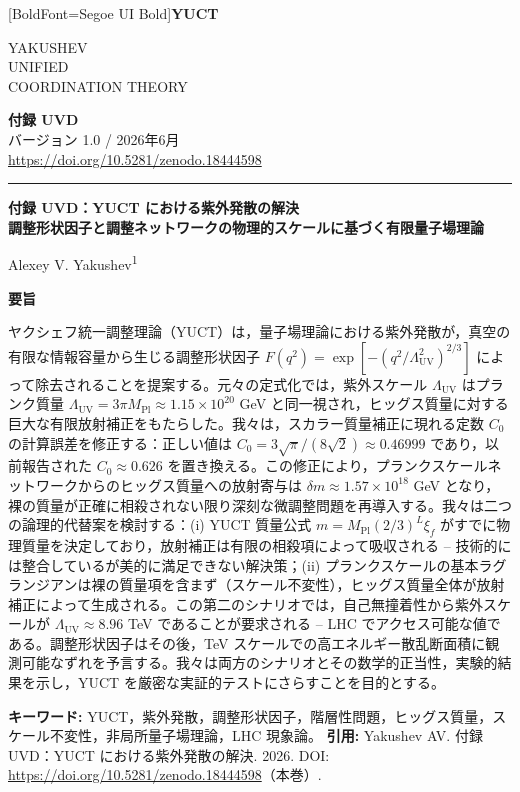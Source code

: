 \documentclass[11pt,a4paper]{article}
\newcommand{\Mpl}{M_{\mathrm{Pl}}}
\newcommand{\LUV}{\Lambda_{\mathrm{UV}}}
\theoremstyle{remark}
\newcommand{\makeheader}{%
	\noindent
	\begin{minipage}{0.17\textwidth}
		\raggedright
		{\fontspec{Segoe UI}[BoldFont=Segoe UI Bold]\bfseries\color{skyblue}\fontsize{46}{46}\selectfont YUCT}%
	\end{minipage}%
	\hspace{30pt}
	\begin{minipage}{0.32\textwidth}
		\raggedright
		{\sffamily\fontsize{11}{13}\selectfont YAKUSHEV\\ UNIFIED\\ COORDINATION THEORY}%
	\end{minipage}%
	\hfill
	\begin{minipage}{0.38\textwidth}
		\raggedleft
		{\sffamily\bfseries 付録 UVD}\\ 
		{\sffamily バージョン 1.0 / 2026年6月}\\ 
		{\sffamily\footnotesize \url{https://doi.org/10.5281/zenodo.18444598}}%
	\end{minipage}
	\par\vspace{5pt}
	\noindent\textcolor{gold}{\rule{\textwidth}{1.6pt}}
	\par\vspace{0pt}
}
\begin{document}
	\thispagestyle{firstpage}
	\makeheader
	
	\vspace{0.5cm}
	{\LARGE\bfseries 付録 UVD：YUCT における紫外発散の解決 \\
		\Large 調整形状因子と調整ネットワークの物理的スケールに基づく有限量子場理論 \par}
	\vspace{0.3cm}
	
	{\large Alexey V. Yakushev\textsuperscript{1}} \\
	\vspace{0.2cm}
	
	{\color{darkblue}\textbf{\LARGE 要旨}} \par
	{\large
		\noindent
		ヤクシェフ統一調整理論（YUCT）は，量子場理論における紫外発散が，真空の有限な情報容量から生じる調整形状因子 \(F(q^2) = \exp[-(q^2/\LUV^2)^{2/3}]\) によって除去されることを提案する。元々の定式化では，紫外スケール \(\LUV\) はプランク質量 \(\LUV = 3\pi\Mpl \approx 1.15\times 10^{20}\) GeV と同一視され，ヒッグス質量に対する巨大な有限放射補正をもたらした。我々は，スカラー質量補正に現れる定数 \(C_0\) の計算誤差を修正する：正しい値は \(C_0 = 3\sqrt{\pi}/(8\sqrt{2}) \approx 0.46999\) であり，以前報告された \(C_0 \approx 0.626\) を置き換える。この修正により，プランクスケールネットワークからのヒッグス質量への放射寄与は \(\delta m \approx 1.57\times 10^{18}\) GeV となり，裸の質量が正確に相殺されない限り深刻な微調整問題を再導入する。我々は二つの論理的代替案を検討する：(i) YUCT 質量公式 \(m = \Mpl(2/3)^L\xi_f\) がすでに物理質量を決定しており，放射補正は有限の相殺項によって吸収される – 技術的には整合しているが美的に満足できない解決策；(ii) プランクスケールの基本ラグランジアンは裸の質量項を含まず（スケール不変性），ヒッグス質量全体が放射補正によって生成される。この第二のシナリオでは，自己無撞着性から紫外スケールが \(\LUV \approx 8.96\) TeV であることが要求される – LHC でアクセス可能な値である。調整形状因子はその後，TeV スケールでの高エネルギー散乱断面積に観測可能なずれを予言する。我々は両方のシナリオとその数学的正当性，実験的結果を示し，YUCT を厳密な実証的テストにさらすことを目的とする。
	}
	
	\vspace{0.2cm}
	\noindent
	{\color{darkblue}\textbf{キーワード:}} YUCT，紫外発散，調整形状因子，階層性問題，ヒッグス質量，スケール不変性，非局所量子場理論，LHC 現象論。
	\vspace{0.1cm}
	\noindent
	{\color{darkblue}\textbf{引用:}} Yakushev AV. 付録 UVD：YUCT における紫外発散の解決. 2026. DOI: \url{https://doi.org/10.5281/zenodo.18444598}（本巻）.
	
\end{document}
